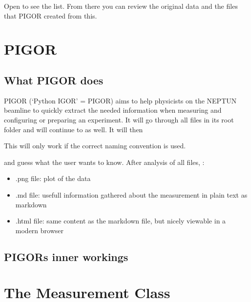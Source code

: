\documentclass[letterpaper,10pt,english]{sphinxmanual}
\begin{document}
Open  to see the list. From there you can review the original data and the files that PIGOR created from this.


\chapter{PIGOR}
\label{\detokenize{pigor:pigor}}\label{\detokenize{pigor::doc}}

\section{What PIGOR does}
\label{\detokenize{pigor:what-pigor-does}}
PIGOR (‘Python IGOR’ = PIGOR) aims to help physicists on the NEPTUN beamline to quickly extract the needed information when measuring and configuring or preparing an experiment. It will go through all files in its root folder and will continue to  as well. It will then  %
\begin{footnote}[1]\sphinxAtStartFootnote
This will only work if the correct naming convention is used.
%
\end{footnote}  and guess what the user wants to know. After analysis of all files, :
\begin{itemize}
\item {} 
.png file: plot of the data

\item {} 
.md file: usefull information gathered about the measurement in plain text as markdown

\item {} 
.html file: same content as the markdown file, but nicely viewable in a modern browser

\end{itemize}


\section{PIGORs inner workings}
\label{\detokenize{pigor:pigors-inner-workings}}

\chapter{The Measurement Class}
\label{\detokenize{measurement:the-measurement-class}}\label{\detokenize{measurement::doc}}
\end{document}
